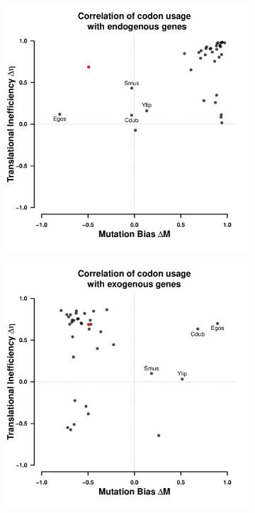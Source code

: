 \documentclass[12pt]{article}
\begin{document}
\begin{figure}[h]
    \centering
    \begin{subfigure}
        \centering
        \includegraphics[width=.45\textwidth]{img/csp_mean_correlation_endo.pdf}
    \end{subfigure}
    \begin{subfigure}
        \centering
        \includegraphics[width=.45\textwidth]{img/csp_mean_correlation_exo.pdf}
    \end{subfigure}
    \caption{}
    \label{fig:csp_endo_exo_comp}
\end{figure}
\end{document}
